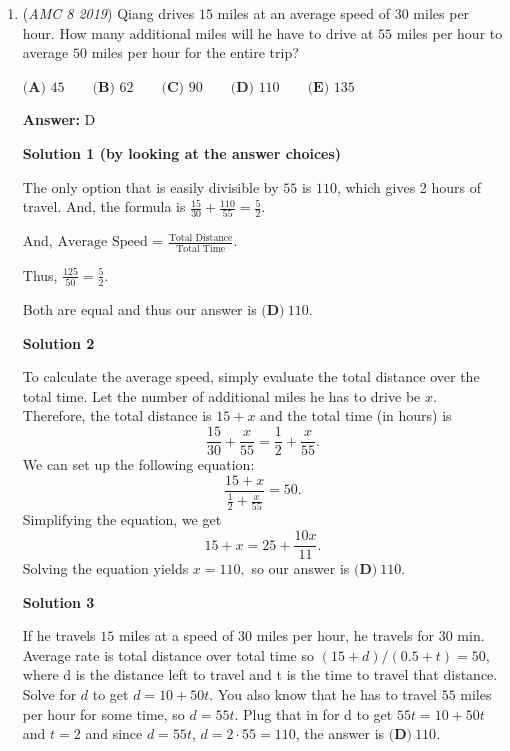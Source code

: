 \begin{enumerate}
 Note: This solution makes use of the dependent events probability formula, $P(A \cap B) = P(A)P(B|A)$, where $P(B|A)$ represents the probability that $B$ occurs given that $A$ has already occurred and $P(A \cup B)$ represents the probability of both $A$ and $B$ happening.

 


	\item (\textit{AMC 8 2019}) Qiang drives $15$ miles at an average speed of $30$ miles per hour. How many additional miles will he have to drive at $55$ miles per hour to average $50$ miles per hour for the entire trip?


 $\textbf{(A) }45\qquad\textbf{(B) }62\qquad\textbf{(C) }90\qquad\textbf{(D) }110\qquad\textbf{(E) }135$

 \textbf{Answer: }D



\textbf{Solution 1 (by looking at the answer choices)}

The only option that is easily divisible by $55$ is $110$, which gives 2 hours of travel. And, the formula is $\frac{15}{30} + \frac{110}{55} = \frac{5}{2}$.

 And, $\text{Average Speed}$ = $\frac{\text{Total Distance}}{\text{Total Time}}$.

 Thus, $\frac{125}{50} = \frac{5}{2}$.

 Both are equal and thus our answer is $\boxed{\textbf{(D)}\ 110}.$




\textbf{Solution 2}

To calculate the average speed, simply evaluate the total distance over the total time. Let the number of additional miles he has to drive be $x.$ Therefore, the total distance is $15+x$ and the total time (in hours) is 
 \[\frac{15}{30}+\frac{x}{55}=\frac{1}{2}+\frac{x}{55}.\] We can set up the following equation: 
 \[\frac{15+x}{\frac{1}{2}+\frac{x}{55}}=50.\] Simplifying the equation, we get 
 \[15+x=25+\frac{10x}{11}.\] Solving the equation yields $x=110,$ so our answer is $\boxed{\textbf{(D)}\ 110}$.

 



\textbf{Solution 3}

If he travels $15$ miles at a speed of $30$ miles per hour, he travels for 30 min. Average rate is total distance over total time so $(15+d)/(0.5 + t) = 50$, where d is the distance left to travel and t is the time to travel that distance. Solve for $d$ to get $d = 10+50t$. You also know that he has to travel $55$ miles per hour for some time, so $d=55t$. Plug that in for d to get $55t = 10+50t$ and $t=2$ and since $d=55t$, $d = 2\cdot55 =110$, the answer is $\boxed{\textbf{(D)}\ 110}$.


\end{enumerate}

